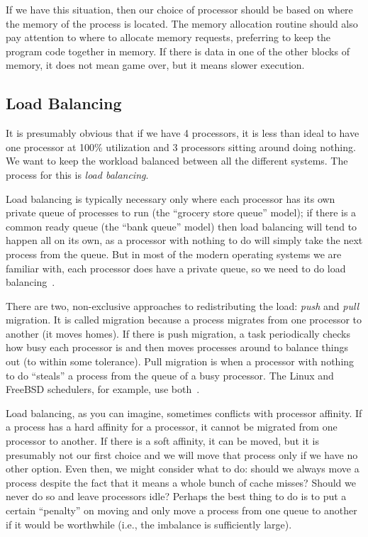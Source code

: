 If we have this situation, then our choice of processor should be based on where the memory of the process is located. The memory allocation routine should also pay attention to where to allocate memory requests, preferring to keep the program code together in memory. If there is data in one of the other blocks of memory, it does not mean game over, but it means slower execution.

\subsection*{Load Balancing}
It is presumably obvious that if we have 4 processors, it is less than ideal to have one processor at 100\% utilization and 3 processors sitting around doing nothing. We want to keep the workload balanced between all the different systems. The process for this is \textit{load balancing}.

Load balancing is typically necessary only where each processor has its own private queue of processes to run (the ``grocery store queue'' model); if there is a common ready queue (the ``bank queue'' model) then load balancing will tend to happen all on its own, as a processor with nothing to do will simply take the next process from the queue. But in most of the modern operating systems we are familiar with, each processor does have a private queue, so we need to do load balancing~\cite{osc}.

There are two, non-exclusive approaches to redistributing the load: \textit{push} and \textit{pull} migration. It is called migration because a process migrates from one processor to another (it moves homes). If there is push migration, a task periodically checks how busy each processor is and then moves processes around to balance things out (to within some tolerance). Pull migration is when a processor with nothing to do ``steals'' a process from the queue of a busy processor. The Linux and FreeBSD schedulers, for example, use both~\cite{osc}.

Load balancing, as you can imagine, sometimes conflicts with processor affinity. If a process has a hard affinity for a processor, it cannot be migrated from one processor to another. If there is a soft affinity, it can be moved, but it is presumably not our first choice and we will move that process only if we have no other option. Even then, we might consider what to do: should we always move a process despite the fact that it means a whole bunch of cache misses? Should we never do so and leave processors idle? Perhaps the best thing to do is to put a certain ``penalty'' on moving and only move a process from one queue to another if it would be worthwhile (i.e., the imbalance is sufficiently large).

